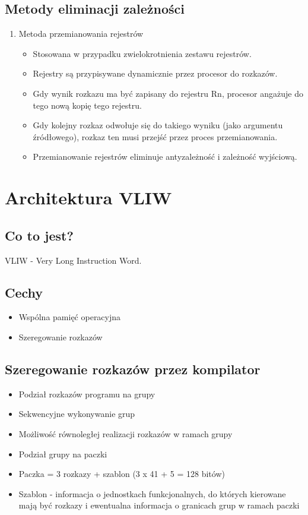 		\subsection*{Metody eliminacji zależności}
			\begin{enumerate}
				\item Metoda przemianowania rejestrów
				\begin{itemize}
					\item Stosowana w przypadku zwielokrotnienia zestawu rejestrów.
					\item Rejestry są przypisywane dynamicznie przez procesor do rozkazów.
					\item Gdy wynik rozkazu ma być zapisany do rejestru Rn, procesor angażuje do tego nową kopię tego rejestru.
					\item Gdy kolejny rozkaz odwołuje się do takiego wyniku (jako argumentu źródłowego), rozkaz ten musi przejść przez proces przemianowania.
					\item Przemianowanie rejestrów eliminuje antyzależność i zależność wyjściową.
				\end{itemize}
			\end{enumerate}
			
	\section*{Architektura VLIW}
		\subsection*{Co to jest?}
		VLIW - Very Long Instruction Word.
		\subsection*{Cechy}
		\begin{itemize}
			\item Wspólna pamięć operacyjna
			\item Szeregowanie rozkazów
		\end{itemize}
		\subsection*{Szeregowanie rozkazów przez kompilator}
		\begin{itemize}
			\item Podział rozkazów programu na grupy
			\item Sekwencyjne wykonywanie grup
			\item Możliwość równoległej realizacji rozkazów w ramach grupy
			\item Podział grupy na paczki
			\item Paczka = 3 rozkazy + szablon (3 x 41 + 5 = 128 bitów)
			\item Szablon - informacja o jednostkach funkcjonalnych, do których kierowane mają być rozkazy i ewentualna informacja o granicach grup w ramach paczki
		\end{itemize}
